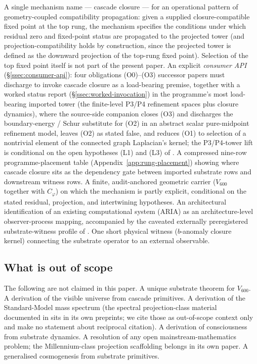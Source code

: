 \documentclass[11pt]{article}
\theoremstyle{definition}
\newcommand{\pphi}{\varphi}
\newcommand{\Vsub}{V_{600}}
\newcommand{\Cphi}{C_{\pphi}}
\begin{document}
A single mechanism name --- cascade closure --- for an operational
pattern of geometry-coupled compatibility propagation: given a
supplied closure-compatible fixed point at the top rung, the
mechanism specifies the conditions under which residual zero and
fixed-point status are propagated to the projected tower (and projection-compatibility holds by construction, since the projected tower is defined as the downward projection of the top-rung fixed point).
Selection of the top fixed point itself is not part of the present
paper. An explicit \emph{consumer API}
(\S\ref{ssec:consumer-api}): four obligations (O0)--(O3) successor
papers must discharge to invoke cascade closure as a load-bearing
premise, together with a worked status report
(\S\ref{ssec:worked-invocation}) in the programme's most
load-bearing imported tower (the finite-level P3/P4 refinement
spaces plus closure dynamics), where the source-side companion
\cite{CascadeRefinementCompat} closes (O3) and discharges the
boundary-energy / Schur substitute for (O2) in an abstract scalar
pure-midpoint refinement model, leaves (O2) as stated false, and
reduces (O1) to selection of a nontrivial element of the connected
graph Laplacian's kernel; the P3/P4-tower lift is conditional on
the open hypotheses (L1) and (L3) of
\cite[\S\texttt{sec:scope-and-gap}]{CascadeRefinementCompat}. A compressed nine-row programme-placement table
(Appendix~\ref{app:rung-placement}) showing where cascade closure
sits as the dependency gate between imported substrate rows and
downstream witness rows. A finite, audit-anchored geometric carrier
($\Vsub$ together with $\Cphi$) on which the mechanism is partly
explicit, conditional on the stated residual, projection, and
intertwining hypotheses. An
architectural identification of an existing computational system
(ARIA) as an architecture-level observer-process mapping, accompanied by the
caveated externally preregistered substrate-witness profile of
\cite{SmartARIAChess}. One short physical
witness ($b$-anomaly closure kernel) connecting the substrate operator
to an external observable.

\subsection{What is out of scope}

The following are not claimed in this paper. A unique substrate
theorem for $\Vsub$. A derivation of the visible universe from cascade
primitives. A derivation of the Standard-Model mass spectrum (the
spectral projection-class material documented in
\cite{SmartV, SmartVRev} sits in its own preprints; we cite those as
out-of-scope context only and make no statement about reciprocal
citation). A derivation of consciousness from substrate dynamics. A
resolution of any open mainstream-mathematics problem; the
Millennium-class projection scaffolding belongs in its own paper. A
generalised cosmogenesis from substrate primitives.
\end{document}
